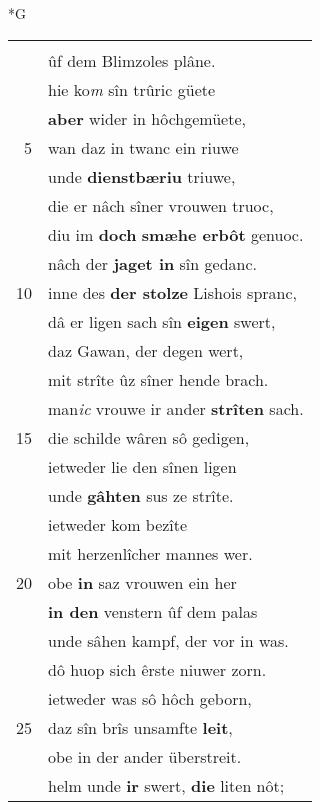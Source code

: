 \documentclass[8pt,a4paper,notitlepage]{article}
\begin{document}
\begin{table}[ht]
\begin{minipage}[t]{0.5\linewidth}
\small
\begin{center}*G
\end{center}
\begin{tabular}{rl}
 & \textbf{\begin{large}E\end{large}r} gab ez Gawane\\ 
 & ûf dem Blimzoles plâne.\\ 
 & hie ko\textit{m} sîn trûric güete\\ 
 & \textbf{aber} wider in hôchgemüete,\\ 
5 & wan daz in twanc ein riuwe\\ 
 & unde \textbf{dienstbæriu} triuwe,\\ 
 & die er nâch sîner vrouwen truoc,\\ 
 & diu im \textbf{doch} \textbf{smæhe erbôt} genuoc.\\ 
 & nâch der \textbf{jaget in} sîn gedanc.\\ 
10 & inne des \textbf{der stolze} Lishois spranc,\\ 
 & dâ er ligen sach sîn \textbf{eigen} swert,\\ 
 & daz Gawan, der degen wert,\\ 
 & mit strîte ûz sîner hende brach.\\ 
 & man\textit{ic} vrouwe ir ander \textbf{strîten} sach.\\ 
15 & die schilde wâren sô gedigen,\\ 
 & ietweder lie den sînen ligen\\ 
 & unde \textbf{gâhten} sus ze strîte.\\ 
 & ietweder kom bezîte\\ 
 & mit herzenlîcher mannes wer.\\ 
20 & obe \textbf{in} saz vrouwen ein her\\ 
 & \textbf{in den} venstern ûf dem palas\\ 
 & unde sâhen kampf, der vor in was.\\ 
 & dô huop sich êrste niuwer zorn.\\ 
 & ietweder was sô hôch geborn,\\ 
25 & daz sîn brîs unsamfte \textbf{leit},\\ 
 & obe in der ander überstreit.\\ 
 & helm unde \textbf{ir} swert, \textbf{die} liten nôt;\\ 

\end{tabular}
\end{minipage}
\end{table}
\end{document}

